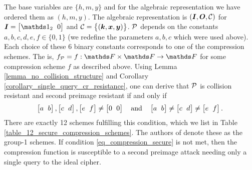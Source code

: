 \begin{pchstack}[center,space=2cm]
\end{pchstack}
The base variables are $\{h, m, y\}$ and for the algebraic representation we have ordered them as $(h, m, y)$.
The algebraic representation is $(\I, \O, \C)$ for $\I = \m{\Id_2 & 0}$ and $\C = \big\{(\vk, \vx, \vy) \big\}$.
$\P$ depends on the constants $a,b,c,d,e,f \in \{0,1\}$ (we redefine the parameters $a,b,c$ which were used above).
Each choice of these 6 binary constants corresponds to one of the compression schemes.
The is, $f_\P = f:\F \times \F \to \F$ for some compression scheme $f$ as described above.
% 
Using Lemma \ref{lemma_no_collision_structure} and Corollary \ref{corollary_single_query_cr_resistance},
one can derive that $\P$ is collision resistant and second preimage resistant if and only if
\begin{equation}
\label{eq_compression_secure}
    \m{a&b}, \m{c&d}, \m{e&f} \neq \m{0&0} \quad \textrm{and}\quad \m{a&b} \neq\m{c&d} \neq \m{e&f}.
\end{equation}
There are exactly 12 schemes fulfilling this condition,
which we list in Table \ref{table_12_secure_compression_schemes}.
The authors of \cite{C:BlaRogShr02} denote these as the group-1 schemes.
If condition \eqref{eq_compression_secure} is not met,
then the compression function is susceptible to a second preimage attack needing only a single query to the ideal cipher.

